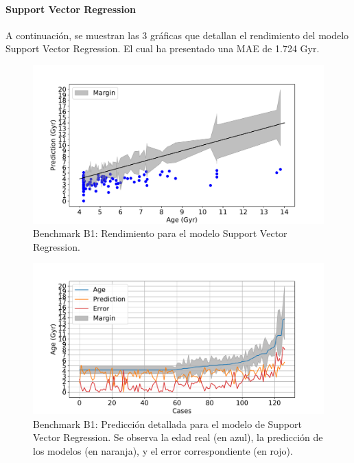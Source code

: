 \paragraph{Support Vector Regression} 
A continuación, se muestran las 3 gráficas que detallan el rendimiento del modelo Support Vector Regression. El cual ha presentado una MAE de 1.724 Gyr.
\begin{figure}[H]
\begin{center}
 \includegraphics[width=0.8\linewidth]{Figuras/Experimentos/B_B1_svm_1.pdf}
\end{center}
\caption{Benchmark B1: Rendimiento para el modelo Support Vector Regression.}
 \label{fig:benchB1_details_svm_1}
\end{figure}

\begin{figure}[H]
\begin{center}
 \includegraphics[width=0.8\linewidth]{Figuras/Experimentos/B_B1_svm_2.pdf}
\end{center}
\caption{Benchmark B1: Predicción detallada para el modelo de Support Vector Regression. Se observa la edad real (en azul), la predicción de los modelos (en naranja), y el error correspondiente (en rojo).}
 \label{fig:benchB1_details_svm_2}
\end{figure}

